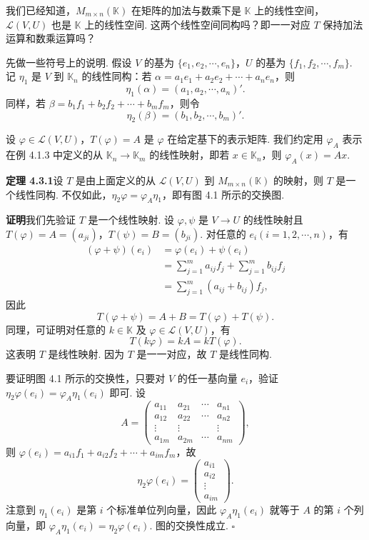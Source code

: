 \documentclass[UTF8,12pt,a4paper,fontset=fandol]{ctexart}
\begin{document}
我们已经知道，$M_{m\times n}(\mathbb{K})$ 在矩阵的加法与数乘下是 $\mathbb{K}$ 上的线性空间，$\mathcal{L}(V,U)$ 也是 $\mathbb{K}$ 上的线性空间. 这两个线性空间同构吗？即一一对应 $T$ 保持加法运算和数乘运算吗？

先做一些符号上的说明. 假设 $V$ 的基为 $\{e_1,e_2,\cdots,e_n\}$，$U$ 的基为 $\{f_1,f_2,\cdots,f_m\}$. 记 $\eta_1$ 是 $V$ 到 $\mathbb{K}_n$ 的线性同构：若 $\alpha=a_1e_1+a_2e_2+\cdots+a_ne_n$，则
\[
\eta_1(\alpha)=(a_1,a_2,\cdots,a_n)'.
\]
同样，若 $\beta=b_1f_1+b_2f_2+\cdots+b_mf_m$，则令
\[
\eta_2(\beta)=(b_1,b_2,\cdots,b_m)'.
\]

设 $\varphi\in\mathcal{L}(V,U)$，$T(\varphi)=A$ 是 $\varphi$ 在给定基下的表示矩阵. 我们约定用 $\varphi_A$ 表示在例 4.1.3 中定义的从 $\mathbb{K}_n\to\mathbb{K}_m$ 的线性映射，即若 $x\in\mathbb{K}_n$，则 $\varphi_A(x)=Ax$.

\noindent\textbf{定理 4.3.1}\quad 设 $T$ 是由上面定义的从 $\mathcal{L}(V,U)$ 到 $M_{m\times n}(\mathbb{K})$ 的映射，则 $T$ 是一个线性同构. 不仅如此，$\eta_2\varphi=\varphi_A\eta_1$，即有图 4.1 所示的交换图.

\noindent\textbf{证明}\quad 我们先验证 $T$ 是一个线性映射. 设 $\varphi,\psi$ 是 $V\to U$ 的线性映射且 $T(\varphi)=A=(a_{ji})$，$T(\psi)=B=(b_{ji})$. 对任意的 $e_i(i=1,2,\cdots,n)$，有
\[
\begin{aligned}
(\varphi+\psi)(e_i)
&=\varphi(e_i)+\psi(e_i)\\
&=\sum_{j=1}^m a_{ij}f_j+\sum_{j=1}^m b_{ij}f_j\\
&=\sum_{j=1}^m(a_{ij}+b_{ij})f_j,
\end{aligned}
\]
因此
\[
T(\varphi+\psi)=A+B=T(\varphi)+T(\psi).
\]
同理，可证明对任意的 $k\in\mathbb{K}$ 及 $\varphi\in\mathcal{L}(V,U)$，有
\[
T(k\varphi)=kA=kT(\varphi).
\]
这表明 $T$ 是线性映射. 因为 $T$ 是一一对应，故 $T$ 是线性同构.

要证明图 4.1 所示的交换性，只要对 $V$ 的任一基向量 $e_i$，验证 $\eta_2\varphi(e_i)=\varphi_A\eta_1(e_i)$ 即可. 设
\[
A=
\left(\begin{array}{cccc}
a_{11} & a_{21} & \cdots & a_{n1}\\
a_{12} & a_{22} & \cdots & a_{n2}\\
\vdots & \vdots & & \vdots\\
a_{1m} & a_{2m} & \cdots & a_{nm}
\end{array}\right),
\]
则 $\varphi(e_i)=a_{i1}f_1+a_{i2}f_2+\cdots+a_{im}f_m$，故
\[
\eta_2\varphi(e_i)=
\left(\begin{array}{c}
a_{i1}\\
a_{i2}\\
\vdots\\
a_{im}
\end{array}\right).
\]
注意到 $\eta_1(e_i)$ 是第 $i$ 个标准单位列向量，因此 $\varphi_A\eta_1(e_i)$ 就等于 $A$ 的第 $i$ 个列向量，即 $\varphi_A\eta_1(e_i)=\eta_2\varphi(e_i)$. 图的交换性成立. $\square$
\end{document}
